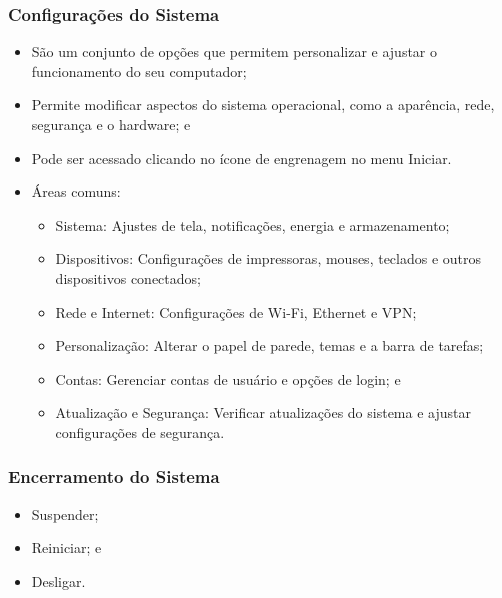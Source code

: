 \documentclass[aspectratio=169]{beamer} %
\begin{document}
\begin{frame}
	\frametitle{Configurações do Sistema}
	
	\begin{itemize}
		\item São um conjunto de opções que permitem personalizar e ajustar o funcionamento do seu computador;
		\item Permite modificar aspectos do sistema operacional, como a aparência, rede, segurança e o hardware; e
		\item Pode ser acessado clicando no ícone de engrenagem no menu Iniciar.
		\item Áreas comuns:
		\begin{itemize}
			\item Sistema: Ajustes de tela, notificações, energia e armazenamento;
			\item Dispositivos: Configurações de impressoras, mouses, teclados e outros dispositivos conectados;
			\item Rede e Internet: Configurações de Wi-Fi, Ethernet e VPN;
			\item Personalização: Alterar o papel de parede, temas e a barra de tarefas;
			\item Contas: Gerenciar contas de usuário e opções de login; e
			\item Atualização e Segurança: Verificar atualizações do sistema e ajustar configurações de segurança.
		\end{itemize}
	\end{itemize}
\end{frame}

\begin{frame}
	\frametitle{Encerramento do Sistema}
	
	\begin{itemize}
		\item Suspender;
		\item Reiniciar; e
		\item Desligar.
	\end{itemize}
\end{frame}
\end{document}
